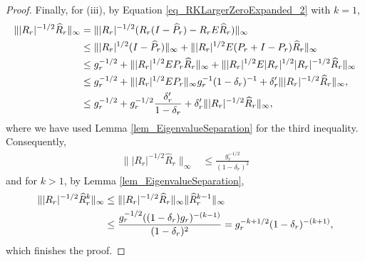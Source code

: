 \documentclass[a4paper,11pt]{article} %
\numberwithin{equation}{section}
\theoremstyle{definition}
\theoremstyle{remark}
\theoremstyle{plain}
\begin{document}
\begin{proof}
  Finally, for (iii), by Equation \eqref{eq_RKLargerZeroExpanded_2} with 
  \( k = 1 \),
  \begin{align}
            \| | R_{r} |^{-1/2} \widehat{R}_{r} \|_{\infty}
    & = 
            \| | R_{r} |^{-1/2} 
               ( R_{r} ( I - \widehat{P}_{r} ) - R_{r} E \widehat{R}_{r} )
            \|_{\infty} 
    \\
    & \le
            \| | R_{r} |^{1/2} ( I - \widehat{P}_{r} ) \|_{\infty} 
          + 
            \| | R_{r} |^{1/2} E ( P_{r} + I - P_{r} ) \widehat{R}_{r}
            \|_{\infty} 
    \notag
    \\
    & \le 
            g_{r}^{-1/2} 
          + 
            \| | R_{r} |^{1/2} E P_{r} \widehat{R}_{r} \|_{\infty}
          + 
            \| | R_{r} |^{1/2} E | R_{r} |^{1/2} | R_{r} |^{-1/2} \widehat{R}_{r} 
            \|_{\infty}
    \notag
    \\
    & \le 
            g_{r}^{-1/2} 
          + 
            \| | R_{r} |^{1/2} E P_{r} \|_{\infty}
            g_{r}^{-1} ( 1 - \delta_{r} )^{-1} 
          + 
            \delta_{r}' \| | R_{r} |^{-1/2} \widehat{R}_{r} \|_{\infty}, 
    \notag
    \\
    & \le 
            g_{r}^{-1/2} 
          + 
            g_{r}^{-1/2} 
            \frac{ \delta_{r}' }{ 1 - \delta_{r} }
          + 
            \delta_{r}' \| | R_{r} |^{-1/2} \widehat{R}_{r} \|_{\infty},
    \notag
  \end{align}
  where we have used Lemma \ref{lem_EigenvalueSeparation} for the third inequality.
  Consequently,
  \begin{align}
          \| | R_{r} |^{-1/2} \widehat{R}_{r} \|_{\infty}
    & \le 
          \frac{ g_{r}^{-1/2} }{ ( 1 - \delta_{r} )^{2} } 
  \end{align}
  and for \( k > 1 \), by Lemma \ref{lem_EigenvalueSeparation},
  \begin{align}
           \| | R_{r} |^{-1/2} \widehat{R}_{r}^{k} \|_{ \infty } 
    & \le 
           \| | R_{r} |^{-1/2} \widehat{R}_{r} \|_{ \infty } 
           \| \widehat{R}_{r}^{ k - 1 } \|_{ \infty }
    \\
    & \le 
           \frac{ g_{r}^{-1/2} ( ( 1 - \delta_{r} ) g_{r} )^{ -(k - 1) } }
                { ( 1 - \delta_{r} )^{2}               } 
    = 
           g_{r}^{ - k + 1/2 } ( 1 - \delta_{r} )^{ -(k + 1) },
    \notag
  \end{align}
  which finishes the proof.
\end{proof}%
\end{document}
